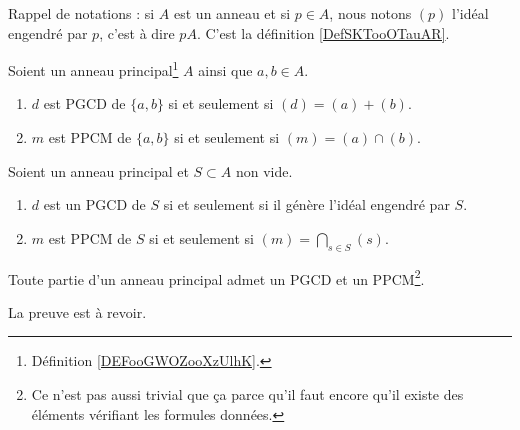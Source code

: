 Rappel de notations : si \( A\) est un anneau et si \( p\in A\), nous notons \( (p)\) l'idéal engendré par \( p\), c'est à dire \( pA\). C'est la définition \ref{DefSKTooOTauAR}.

\begin{lemma}         \label{LEMooARNUooXqrJGa}
	Soient un anneau principal\footnote{Définition \ref{DEFooGWOZooXzUlhK}.} \( A\) ainsi que \( a,b\in A\).
	\begin{enumerate}
		\item
		      \( d\) est PGCD de \( \{ a,b \}\) si et seulement si \( (d)=(a)+(b)\).
		\item
		      \( m\) est PPCM de \( \{ a,b \}\) si et seulement si \( (m)=(a)\cap (b)\).
	\end{enumerate}
\end{lemma}

\begin{theorem}
	Soient un anneau principal et \( S\subset A\) non vide.
	\begin{enumerate}
		\item
		      \( d\) est un PGCD de \( S\) si et seulement si il génère l'idéal engendré par \( S\).
		\item
		      \( m\) est PPCM de \( S\) si et seulement si \( (m)=\bigcap_{s\in S}(s)\).
	\end{enumerate}
	Toute partie d'un anneau principal admet un PGCD et un PPCM\footnote{ Ce n'est pas aussi trivial que ça parce qu'il faut encore qu'il existe des éléments vérifiant les formules données.}.
\end{theorem}

\begin{probleme}
	La preuve est à revoir.     %
\end{probleme}


